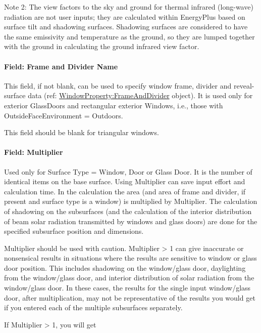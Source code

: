Note 2: The view factors to the sky and ground for thermal infrared (long-wave) radiation are not user inputs; they are calculated within EnergyPlus based on surface tilt and shadowing surfaces. Shadowing surfaces are considered to have the same emissivity and temperature as the ground, so they are lumped together with the ground in calculating the ground infrared view factor.

\paragraph{Field: Frame and Divider Name}\label{field-frame-and-divider-name-2}

This field, if not blank, can be used to specify window frame, divider and reveal-surface data (ref: \hyperref[windowpropertyframeanddivider]{WindowProperty:FrameAndDivider} object). It is used only for exterior GlassDoors and rectangular exterior Windows, i.e., those with OutsideFaceEnvironment = Outdoors.

This field should be blank for triangular windows.

\paragraph{Field: Multiplier}\label{field-multiplier-7}

Used only for Surface Type = Window, Door or Glass Door. It is the number of identical items on the base surface. Using Multiplier can save input effort and calculation time. In the calculation the area (and area of frame and divider, if present and surface type is a window) is multiplied by Multiplier. The calculation of shadowing on the subsurfaces (and the calculation of the interior distribution of beam solar radiation transmitted by windows and glass doors) are done for the specified subsurface position and dimensions.

Multiplier should be used with caution. Multiplier \textgreater{} 1 can give inaccurate or nonsensical results in situations where the results are sensitive to window or glass door position. This includes shadowing on the window/glass door, daylighting from the window/glass door, and interior distribution of solar radiation from the window/glass door. In these cases, the results for the single input window/glass door, after multiplication, may not be representative of the results you would get if you entered each of the multiple subsurfaces separately.

If Multiplier \textgreater{} 1, you will get


